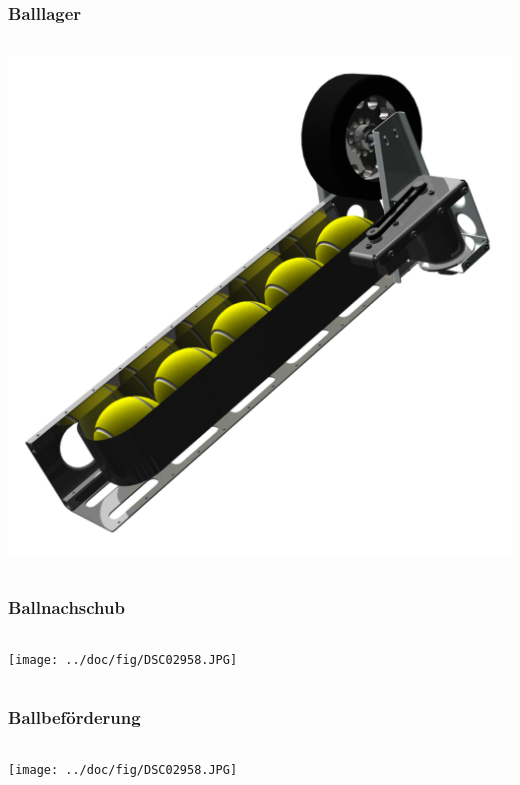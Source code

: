 \begin{frame}
    \frametitle{Balllager}
    \begin{columns}
        \begin{column}{0.7\textwidth}
            \centering
            \includegraphics[width=1.0\textwidth]{FotosM/Bild7.png}
        \end{column}
    \end{columns}
\end{frame}
\begin{frame}
    \frametitle{Ballnachschub}
    \begin{columns}
        \begin{column}{0.8\textwidth}
            \centering
            \texttt{[image: ../doc/fig/DSC02958.JPG]}
        \end{column}
    \end{columns}
\end{frame}
\begin{frame}
    \frametitle{Ballbeförderung}
    \begin{columns}
        \begin{column}{0.8\textwidth}
            \centering
            \texttt{[image: ../doc/fig/DSC02958.JPG]}
        \end{column}
    \end{columns}
\end{frame}
